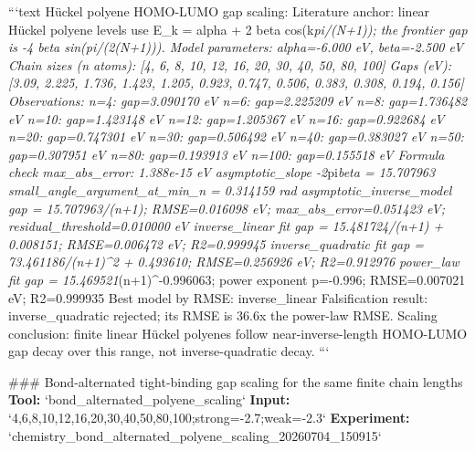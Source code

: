\documentclass[11pt,a4paper]{article}
\begin{document}
```text
Hückel polyene HOMO-LUMO gap scaling:
  Literature anchor: linear Hückel polyene levels use E\_k = alpha + 2 beta cos(k\textit{pi/(N+1)); the frontier gap is -4 beta sin(pi/(2(N+1))).
  Model parameters: alpha=-6.000 eV, beta=-2.500 eV
  Chain sizes (n atoms): [4, 6, 8, 10, 12, 16, 20, 30, 40, 50, 80, 100]
  Gaps (eV): [3.09, 2.225, 1.736, 1.423, 1.205, 0.923, 0.747, 0.506, 0.383, 0.308, 0.194, 0.156]
  Observations:
    n=4: gap=3.090170 eV
    n=6: gap=2.225209 eV
    n=8: gap=1.736482 eV
    n=10: gap=1.423148 eV
    n=12: gap=1.205367 eV
    n=16: gap=0.922684 eV
    n=20: gap=0.747301 eV
    n=30: gap=0.506492 eV
    n=40: gap=0.383027 eV
    n=50: gap=0.307951 eV
    n=80: gap=0.193913 eV
    n=100: gap=0.155518 eV
  Formula check max\_abs\_error: 1.388e-15 eV
  asymptotic\_slope -2}pi\textit{beta = 15.707963
  small\_angle\_argument\_at\_min\_n = 0.314159 rad
  asymptotic\_inverse\_model gap = 15.707963/(n+1); RMSE=0.016098 eV; max\_abs\_error=0.051423 eV; residual\_threshold=0.010000 eV
  inverse\_linear fit gap = 15.481724/(n+1) + 0.008151; RMSE=0.006472 eV; R2=0.999945
  inverse\_quadratic fit gap = 73.461186/(n+1)\textasciicircum{}2 + 0.493610; RMSE=0.256926 eV; R2=0.912976
  power\_law fit gap = 15.469521}(n+1)\textasciicircum{}-0.996063; power exponent p=-0.996; RMSE=0.007021 eV; R2=0.999935
  Best model by RMSE: inverse\_linear
  Falsification result: inverse\_quadratic rejected; its RMSE is 36.6x the power-law RMSE.
  Scaling conclusion: finite linear Hückel polyenes follow near-inverse-length HOMO-LUMO gap decay over this range, not inverse-quadratic decay.
```

\#\#\# Bond-alternated tight-binding gap scaling for the same finite chain lengths
\textbf{Tool:} `bond\_alternated\_polyene\_scaling`
\textbf{Input:} `4,6,8,10,12,16,20,30,40,50,80,100;strong=-2.7;weak=-2.3`
\textbf{Experiment:} `chemistry\_bond\_alternated\_polyene\_scaling\_20260704\_150915`
\end{document}

